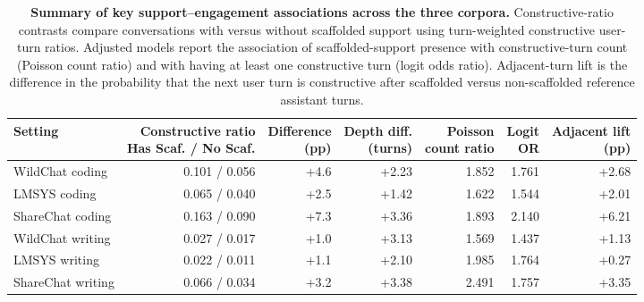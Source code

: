 \begin{table}[t]
\footnotesize
\centering
\caption{
\textbf{Summary of key support--engagement associations across the three corpora.}
Constructive-ratio contrasts compare conversations with versus without scaffolded support using turn-weighted constructive user-turn ratios. Adjusted models report the association of scaffolded-support presence with constructive-turn count (Poisson count ratio) and with having at least one constructive turn (logit odds ratio). Adjacent-turn lift is the difference in the probability that the next user turn is constructive after scaffolded versus non-scaffolded reference assistant turns.
}
\label{tab:support_engagement_summary}

\setlength{\tabcolsep}{3pt}
\renewcommand{\arraystretch}{1.14}

\begin{tabular*}{\textwidth}{@{\extracolsep{\fill}}lrrrrrr@{}}
\toprule
Setting
& \makecell{Constructive ratio\\Has Scaf. / No Scaf.}
& \makecell{Difference\\(pp)}
& \makecell{Depth diff.\\(turns)}
& \makecell{Poisson\\count ratio}
& \makecell{Logit\\OR}
& \makecell{Adjacent lift\\(pp)} \\
\midrule
WildChat coding   & 0.101 / 0.056 & +4.6 & +2.23 & 1.852 & 1.761 & +2.68 \\
LMSYS coding      & 0.065 / 0.040 & +2.5 & +1.42 & 1.622 & 1.544 & +2.01 \\
ShareChat coding  & 0.163 / 0.090 & +7.3 & +3.36 & 1.893 & 2.140 & +6.21 \\
WildChat writing  & 0.027 / 0.017 & +1.0 & +3.13 & 1.569 & 1.437 & +1.13 \\
LMSYS writing     & 0.022 / 0.011 & +1.1 & +2.10 & 1.985 & 1.764 & +0.27 \\
ShareChat writing & 0.066 / 0.034 & +3.2 & +3.38 & 2.491 & 1.757 & +3.35 \\
\bottomrule
\end{tabular*}
\end{table}
